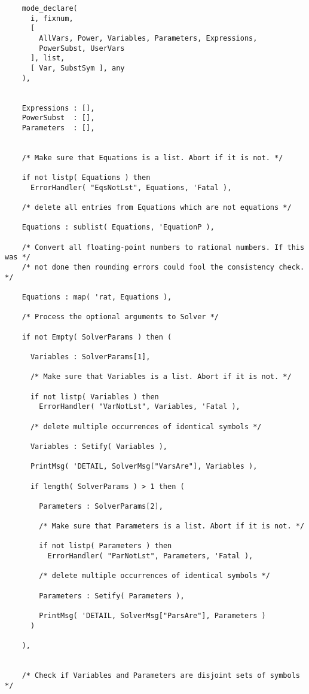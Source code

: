 \begin{verbatim}
    mode_declare(
      i, fixnum,
      [
        AllVars, Power, Variables, Parameters, Expressions,
        PowerSubst, UserVars
      ], list,
      [ Var, SubstSym ], any
    ),


    Expressions : [],
    PowerSubst  : [],
    Parameters  : [],


    /* Make sure that Equations is a list. Abort if it is not. */

    if not listp( Equations ) then
      ErrorHandler( "EqsNotLst", Equations, 'Fatal ),

    /* delete all entries from Equations which are not equations */

    Equations : sublist( Equations, 'EquationP ),

    /* Convert all floating-point numbers to rational numbers. If this was */
    /* not done then rounding errors could fool the consistency check.     */

    Equations : map( 'rat, Equations ),

    /* Process the optional arguments to Solver */

    if not Empty( SolverParams ) then (

      Variables : SolverParams[1],

      /* Make sure that Variables is a list. Abort if it is not. */

      if not listp( Variables ) then
        ErrorHandler( "VarNotLst", Variables, 'Fatal ),

      /* delete multiple occurrences of identical symbols */

      Variables : Setify( Variables ),

      PrintMsg( 'DETAIL, SolverMsg["VarsAre"], Variables ),

      if length( SolverParams ) > 1 then (

        Parameters : SolverParams[2],

        /* Make sure that Parameters is a list. Abort if it is not. */

        if not listp( Parameters ) then
          ErrorHandler( "ParNotLst", Parameters, 'Fatal ),

        /* delete multiple occurrences of identical symbols */

        Parameters : Setify( Parameters ),

        PrintMsg( 'DETAIL, SolverMsg["ParsAre"], Parameters )
      )

    ),


    /* Check if Variables and Parameters are disjoint sets of symbols */


\end{verbatim}
